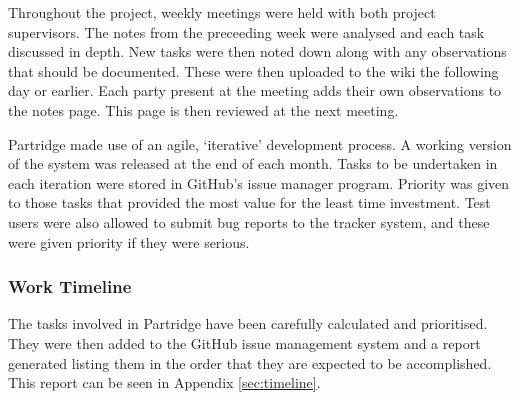 Throughout the project, weekly meetings were held with both project
supervisors. The notes from the preceeding week were analysed and each task
discussed in depth. New tasks were then noted down along with any observations
that should be documented. These were then uploaded to the wiki the following
day or earlier. Each party present at the meeting adds their own observations
to the notes page. This page is then reviewed at the next meeting.

Partridge made use of an agile, `iterative' development process. A working
version of the system was released at the end of each month. Tasks to be
undertaken in each iteration were stored in GitHub's issue manager program.
Priority was given to those tasks that provided the most value for the least
time investment. Test users were also allowed to submit bug reports to the
tracker system, and these were given priority if they were serious. 


\subsubsection{ Work Timeline }

The tasks involved in Partridge have been carefully calculated and prioritised.
They were then added to the GitHub issue management system and a report
generated listing them in the order that they are expected to be
accomplished. This report can be seen in Appendix \ref{sec:timeline}. 


